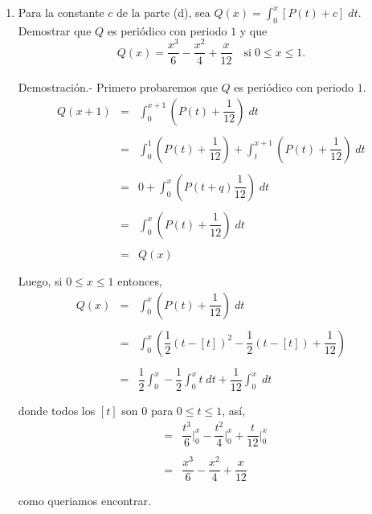 \begin{enumerate}[\bfseries  1.]
\begin{enumerate}[\bfseries (a)]
	    \item Para la constante $c$ de la parte (d), sea $Q(x)=\int_0^x \left[P(t)+c\right]\; dt$. Demostrar que $Q$ es periódico con periodo $1$ y que 
		$$Q(x)=\dfrac{x^3}{6}-\dfrac{x^2}{4}+\dfrac{x}{12}\quad \mbox{si}\; 0\leq x\leq 1.$$\\
		Demostración.-\; Primero probaremos que $Q$ es periódico con periodo $1$.
		$$\begin{array}{rcl}
		    Q(x+1)&=&\displaystyle\int_0^{x+1}\left(P(t)+\dfrac{1}{12}\right)\; dt\\\\
			  &=&\displaystyle\int_0^1\left(P(t)+\dfrac{1}{12}\right)+\int_t^{x+1}\left(P(t)+\dfrac{1}{12}\right)\; dt\\\\
		    &=&0+\displaystyle\int_0^x \left(P(t+q)\dfrac{1}{12}\right)\; dt\\\\
		    &=&\displaystyle\int_0^x \left(P(t)+\dfrac{1}{12}\right)\; dt\\\\
		    &=&Q(x)\\\\
		\end{array}$$	
		Luego, si $0\leq x \leq 1$ entonces,
		$$\begin{array}{rcl}
		    Q(x)&=&\displaystyle\int_0^x\left(P(t)+\dfrac{1}{12}\right)\; dt\\\\
			&=&\displaystyle\int_0^x \left(\dfrac{1}{2}(t-[t])^2-\dfrac{1}{2}(t-[t])+\dfrac{1}{12}\right)\\\\
			&=&\dfrac{1}{2}\displaystyle\int_0^x-\dfrac{1}{2}\int_0^x t\; dt + \dfrac{1}{12}\int_0^x\; dt\\\\
		\end{array}$$
		donde todos los $[t]$  son $0$ para $0\leq t \leq 1$, así,
		$$\begin{array}{rcl}
		    &=&\dfrac{t^3}{6}\bigg|_0^x-\dfrac{t^2}{4}\bigg|_0^x+\dfrac{t}{12}\bigg|_0^x\\\\
		    &=&\dfrac{x^3}{6}-\dfrac{x^2}{4}+\dfrac{x}{12}\\\\
		\end{array}$$
		como queriamos encontrar.\\\\


\end{enumerate}
\end{enumerate}
